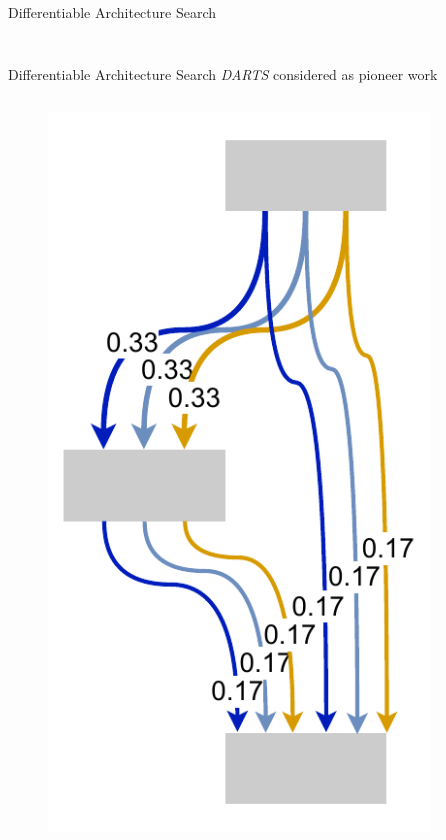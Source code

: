 \documentclass[]{beamer}
\begin{document}
\begin{frame}{Differentiable Architecture Search}
\begin{columns}
\begin{column}{.68\textwidth}
\begin{figure}
\end{figure}
\end{column}
\end{columns}
\end{frame}

\begin{frame}{Differentiable Architecture Search}
\vspace{10pt}
\textit{DARTS} \cite{Liu2018} considered as pioneer work
\vfill
\begin{columns}
\begin{column}{.35\textwidth}
\begin{figure}
	\includegraphics[scale=0.4, center]{graphics/quick/darts_1.drawio.pdf}
\end{figure}
\end{column}
\begin{column}{.3\textwidth}
\end{column}
\begin{column}{.35\textwidth}
\end{column}
\end{columns}
\end{frame}
\end{document}
